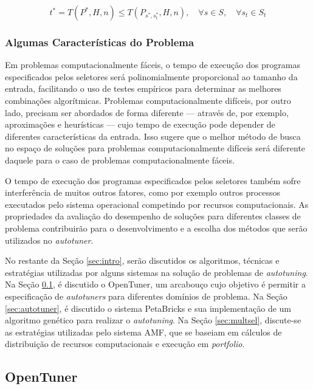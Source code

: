 \documentclass[a4paper, 12pt]{article}
\begin{document}
\begin{equation*}
    t^* = T(P^*,H,n) \leq T(P_{s^*,s_{t}^{*}},H,n), \quad \forall s \in S, \quad \forall s_t \in S_t
\end{equation*}

\subsubsection{Algumas Características do Problema}

Em problemas computacionalmente fáceis, o tempo de execução dos programas
especificados pelos seletores será polinomialmente proporcional ao tamanho da 
entrada, facilitando o uso de testes empíricos para determinar as melhores
combinações algorítmicas. Problemas computacionalmente difíceis, por outro 
lado, precisam ser abordados de forma diferente --- através de, por exemplo,
aproximações e heurísticas --- cujo tempo de execução pode depender de 
diferentes características da entrada. Isso sugere que o melhor método de busca
no espaço de soluções para problemas computacionalmente difíceis será diferente
daquele para o caso de problemas computacionalmente fáceis.

O tempo de execução dos programas especificados pelos seletores também sofre
interferência de muitos outros fatores, como por exemplo outros processos 
executados pelo sistema operacional competindo por recursos computacionais.
As propriedades da avaliação do desempenho de soluções para diferentes classes 
de problema contribuirão para o desenvolvimento e a escolha dos métodos
que serão utilizados no \emph{autotuner}.

No restante da Seção \ref{sec:intro}, serão discutidos os algoritmos, técnicas 
e estratégias utilizadas por alguns sistemas na solução de problemas de 
\emph{autotuning}. Na Seção \ref{sec:opent}, é discutido o OpenTuner,
um arcabouço cujo objetivo é permitir a especificação de \emph{autotuners} 
para diferentes domínios de problema. Na Seção \ref{sec:autotuner}, é discutido
o sistema PetaBricks e sua implementação de um algoritmo genético para realizar
o \emph{autotuning}. Na Seção \ref{sec:multsel}, discute-se as estratégias 
utilizadas pelo sistema AMF, que se baseiam em cálculos de distribuição de 
recursos computacionais e execução em \emph{portfolio}.

\subsection{OpenTuner} \label{sec:opent}
\end{document}
